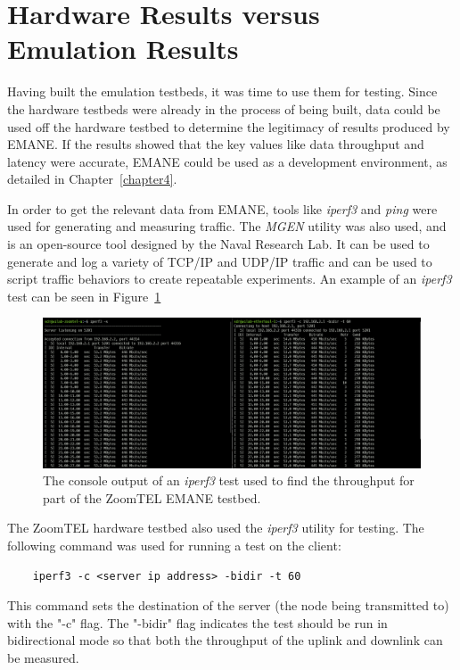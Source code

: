 \section{Hardware Results versus Emulation Results}
Having built the emulation testbeds, it was time to use them for testing.
Since the hardware testbeds were already in the process of being built, data could be used off the hardware testbed to determine the legitimacy of results produced by EMANE.
If the results showed that the key values like data throughput and latency were accurate, EMANE could be used as a development environment, as detailed in Chapter~\ref{chapter4}.\par
In order to get the relevant data from EMANE, tools like \textit{iperf3} and \textit{ping} were used for generating and measuring traffic.
The \textit{MGEN} utility was also used, and is an open-source tool designed by the Naval Research Lab.
It can be used to generate and log a variety of TCP/IP and UDP/IP traffic and can be used to script traffic behaviors to create repeatable experiments.
An example of an \textit{iperf3} test can be seen in Figure~\ref{iperf_test}
\begin{figure}[!ht]
    \centering
    \includegraphics[width=\textwidth,keepaspectratio]{Images/Chpt3/ThroughputTest.png}
    \caption{The console output of an \textit{iperf3} test used to find the throughput for part of the ZoomTEL EMANE testbed.}
    \label{iperf_test}
\end{figure}
The ZoomTEL hardware testbed also used the \textit{iperf3} utility for testing.
The following command was used for running a test on the client:
\begin{verbatim}
    iperf3 -c <server ip address> -bidir -t 60
\end{verbatim}
This command sets the destination of the server (the node being transmitted to) with the "-c" flag.
The "-bidir" flag indicates the test should be run in bidirectional mode so that both the throughput of the uplink and downlink can be measured.
